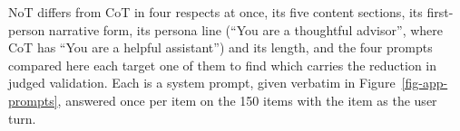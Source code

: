NoT differs from CoT in four respects at once, its five content sections, its
first-person narrative form, its persona line (``You are a thoughtful
advisor'', where CoT has ``You are a helpful assistant'') and its length, and
the four
prompts compared here each target one of them to find which carries the
reduction in judged validation. Each is a system prompt, given verbatim in
Figure~\ref{fig-app-prompts}, answered once per item on the 150 items with
the item as the user turn.
